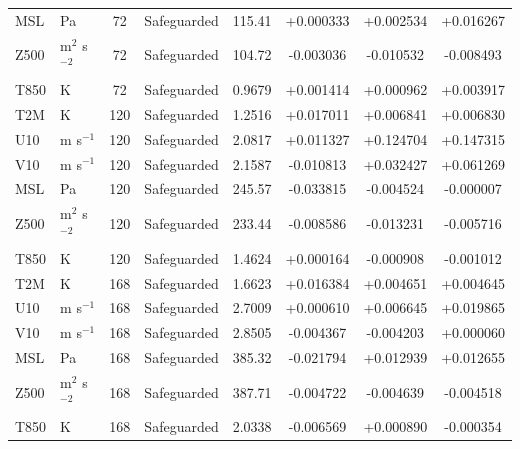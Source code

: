 \begin{tabular}{llcccccc}
MSL & Pa & 72 & Safeguarded & 115.41 & +0.000333 & +0.002534 & +0.016267 \\
Z500 & m$^2$ s$^{-2}$ & 72 & Safeguarded & 104.72 & -0.003036 & -0.010532 & -0.008493 \\
T850 & K & 72 & Safeguarded & 0.9679 & +0.001414 & +0.000962 & +0.003917 \\
T2M & K & 120 & Safeguarded & 1.2516 & +0.017011 & +0.006841 & +0.006830 \\
U10 & m s$^{-1}$ & 120 & Safeguarded & 2.0817 & +0.011327 & +0.124704 & +0.147315 \\
V10 & m s$^{-1}$ & 120 & Safeguarded & 2.1587 & -0.010813 & +0.032427 & +0.061269 \\
MSL & Pa & 120 & Safeguarded & 245.57 & -0.033815 & -0.004524 & -0.000007 \\
Z500 & m$^2$ s$^{-2}$ & 120 & Safeguarded & 233.44 & -0.008586 & -0.013231 & -0.005716 \\
T850 & K & 120 & Safeguarded & 1.4624 & +0.000164 & -0.000908 & -0.001012 \\
T2M & K & 168 & Safeguarded & 1.6623 & +0.016384 & +0.004651 & +0.004645 \\
U10 & m s$^{-1}$ & 168 & Safeguarded & 2.7009 & +0.000610 & +0.006645 & +0.019865 \\
V10 & m s$^{-1}$ & 168 & Safeguarded & 2.8505 & -0.004367 & -0.004203 & +0.000060 \\
MSL & Pa & 168 & Safeguarded & 385.32 & -0.021794 & +0.012939 & +0.012655 \\
Z500 & m$^2$ s$^{-2}$ & 168 & Safeguarded & 387.71 & -0.004722 & -0.004639 & -0.004518 \\
T850 & K & 168 & Safeguarded & 2.0338 & -0.006569 & +0.000890 & -0.000354 \\
\hline
\end{tabular}
